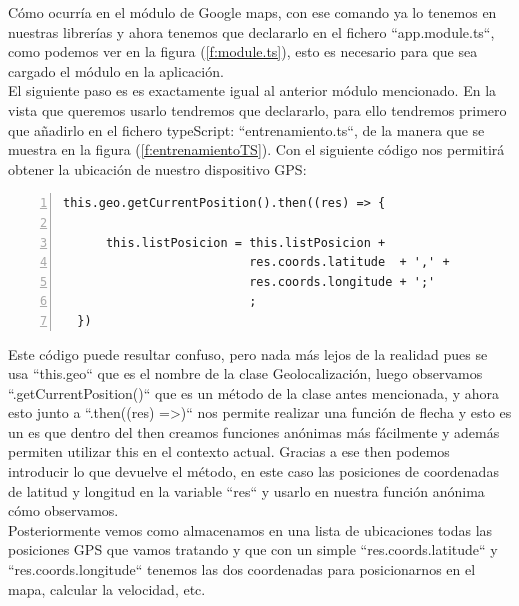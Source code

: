 \documentclass[a4paper, 11pt]{article}
\begin{document}
\begin{itemize}
                Cómo ocurría en el módulo de Google maps, con ese comando ya lo
                tenemos en nuestras librerías y ahora tenemos que
                declararlo en el fichero ``app.module.ts``, como podemos ver en
                la figura (\ref{f:module.ts}), esto es necesario para que sea
                cargado el módulo en la aplicación.\\

                El siguiente paso es es exactamente igual al anterior módulo
                mencionado. En la vista que queremos
                usarlo tendremos que declararlo, para ello tendremos primero que
                añadirlo en el fichero
                typeScript: ``entrenamiento.ts``, de la manera que se muestra en
                la figura (\ref{f:entrenamientoTS}). Con el siguiente código nos
                permitirá obtener la ubicación de nuestro dispositivo GPS:\\

                \begin{lstlisting}[frame=single,numbers=left, numberstyle=\tiny, stepnumber=1, numbersep=-2pt]
  this.geo.getCurrentPosition().then((res) => {

      this.listPosicion = this.listPosicion +
                          res.coords.latitude  + ',' +
                          res.coords.longitude + ';'
                          ;
  })
                \end{lstlisting}


                Este código puede resultar confuso, pero nada más lejos de la realidad
                pues se usa ``this.geo`` que es el nombre de la clase Geolocalización,
                luego observamos ``.getCurrentPosition()`` que es un método de
                la clase antes mencionada, y ahora esto junto a ``.then((res) =>{})``
                nos permite realizar una función de flecha y esto es un es que
                dentro del then creamos funciones anónimas más fácilmente y
                además permiten utilizar this en el contexto actual. Gracias a
                ese then podemos introducir lo que devuelve el método, en este
                caso las posiciones de coordenadas de latitud y longitud en la
                variable ``res`` y usarlo en nuestra función anónima cómo
                observamos.\\

                Posteriormente vemos como almacenamos en una lista de ubicaciones
                todas las posiciones GPS que vamos tratando y que con un simple
                ``res.coords.latitude`` y ``res.coords.longitude`` tenemos las
                dos coordenadas para posicionarnos en el mapa, calcular la velocidad, etc.\\



\end{itemize}
\end{document}
